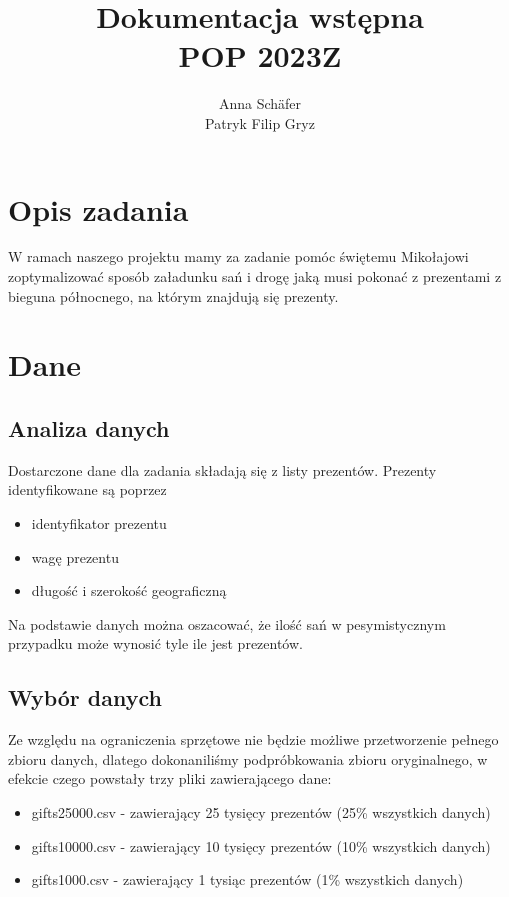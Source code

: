\documentclass[titlepage]{article}
\title{
    {
        \huge Dokumentacja wstępna
    } \\
    POP 2023Z
}
\author {
    Anna Schäfer  \\
    Patryk Filip Gryz
}
\begin{document}
    \maketitle

    \newpage

    \tableofcontents

    \newpage

    \section{
        Opis zadania
    }
    W ramach naszego projektu mamy za zadanie pomóc świętemu Mikołajowi zoptymalizować sposób załadunku sań i 
    drogę jaką musi pokonać z prezentami z bieguna północnego, na którym znajdują się prezenty.

    \section{
        Dane
    }
        \subsection{
            Analiza danych
        }
            Dostarczone dane dla zadania składają się z listy prezentów. Prezenty identyfikowane są poprzez 
            \begin{itemize}
                \item identyfikator prezentu
                \item wagę prezentu
                \item długość i szerokość geograficzną
            \end{itemize}    

            Na podstawie danych można oszacować, że ilość sań w pesymistycznym przypadku może wynosić tyle ile jest prezentów.

        \subsection{
            Wybór danych
        }
            Ze względu na ograniczenia sprzętowe nie będzie możliwe przetworzenie pełnego zbioru danych, 
            dlatego dokonaniliśmy podpróbkowania zbioru oryginalnego, w efekcie czego powstały trzy pliki zawierającego dane:
            \begin{itemize}
                \item gifts25000.csv - zawierający 25 tysięcy prezentów (25\% wszystkich danych)
                \item gifts10000.csv - zawierający 10 tysięcy prezentów (10\% wszystkich danych)
                \item gifts1000.csv - zawierający 1 tysiąc prezentów (1\% wszystkich danych)
            \end{itemize} 
\end{document}
